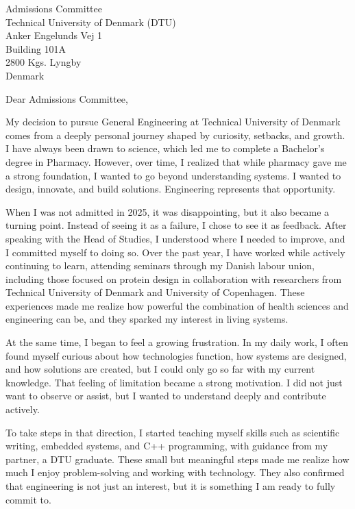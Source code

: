 \documentclass[11pt,a4paper]{letter}
\date{February 22, 2026}
\begin{document}
\begin{letter}{Admissions Committee \\ Technical University of Denmark (DTU) \\ Anker Engelunds Vej 1 \\ Building 101A \\ 2800 Kgs. Lyngby \\ Denmark}

\opening{Dear Admissions Committee,}

My decision to pursue General Engineering at Technical University of Denmark comes from a deeply personal journey shaped by curiosity, setbacks, and growth. I have always been drawn to science, which led me to complete a Bachelor’s degree in Pharmacy. However, over time, I realized that while pharmacy gave me a strong foundation, I wanted to go beyond understanding systems. I wanted to design, innovate, and build solutions. Engineering represents that opportunity.

When I was not admitted in 2025, it was disappointing, but it also became a turning point. Instead of seeing it as a failure, I chose to see it as feedback. After speaking with the Head of Studies, I understood where I needed to improve, and I committed myself to doing so. Over the past year, I have worked while actively continuing to learn, attending seminars through my Danish labour union, including those focused on protein design in collaboration with researchers from Technical University of Denmark and University of Copenhagen. These experiences made me realize how powerful the combination of health sciences and engineering can be, and they sparked my interest in living systems.

At the same time, I began to feel a growing frustration. In my daily work, I often found myself curious about how technologies function, how systems are designed, and how solutions are created, but I could only go so far with my current knowledge. That feeling of limitation became a strong motivation. I did not just want to observe or assist, but I wanted to understand deeply and contribute actively.

To take steps in that direction, I started teaching myself skills such as scientific writing, embedded systems, and C++ programming, with guidance from my partner, a DTU graduate. These small but meaningful steps made me realize how much I enjoy problem-solving and working with technology. They also confirmed that engineering is not just an interest, but it is something I am ready to fully commit to.


\end{letter}
\end{document}
